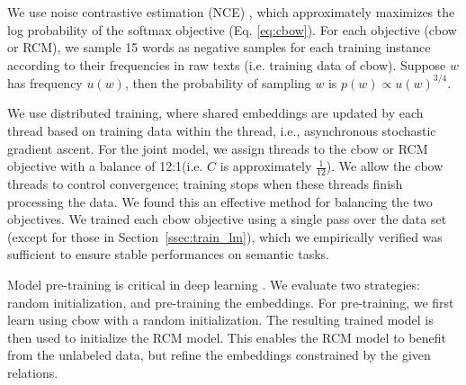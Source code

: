 \documentclass[11pt]{article}
\newcommand{\secref}[1]{Section~\ref{#1}}
\begin{document}
We use noise contrastive estimation (NCE) \cite{mnih2012fast}, which approximately maximizes the log probability of the softmax objective
(Eq. \ref{eq:cbow}).
For each objective (cbow or RCM), we sample 15 words as negative samples for each training instance according
to their frequencies in raw texts (i.e. training data of cbow).
Suppose $w$ has frequency $u(w)$, then the probability of sampling $w$ is $p(w) \propto u(w)^{3/4}$.%

We use distributed training, where shared embeddings are updated by each thread based on training data within
the thread, i.e., asynchronous stochastic gradient ascent. For the joint model, 
we assign threads to the cbow or RCM objective with a balance
of 12:1(i.e. $C$ is approximately $\frac{1}{12}$). %
We allow the cbow threads to control convergence; training stops when these threads finish processing the data.
We found this an effective method for balancing the two objectives.
We trained each cbow objective using a single pass over the data set (except for those in \secref{ssec:train_lm}), which we 
empirically verified was sufficient to ensure stable performances on semantic tasks.


Model pre-training is critical in deep learning \cite{bengio2007greedy,erhan2010does}. We evaluate two
strategies: random initialization, and pre-training the embeddings. For pre-training, we first learn using cbow
with a random initialization. The resulting trained model is then used to initialize the RCM model. This enables
the RCM model to benefit from the unlabeled data, but refine the embeddings constrained by the given relations.
\end{document}
